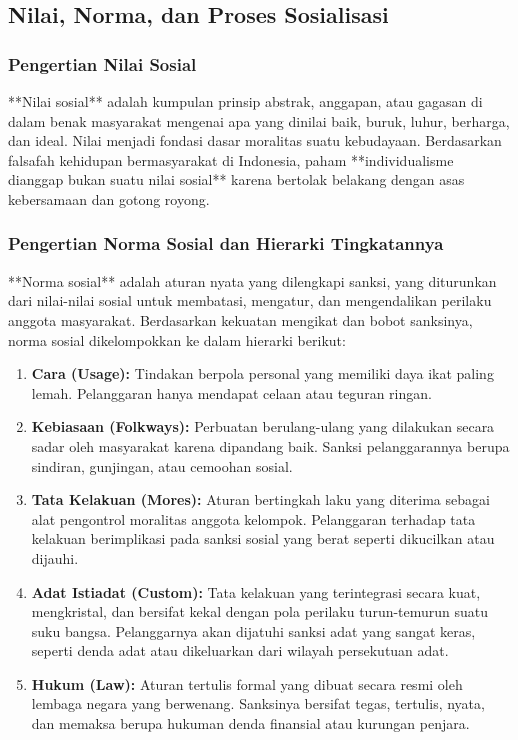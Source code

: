 \documentclass[12pt, a4paper]{article}
\begin{document}
\subsection{Nilai, Norma, dan Proses Sosialisasi}

\subsubsection{Pengertian Nilai Sosial}
**Nilai sosial** adalah kumpulan prinsip abstrak, anggapan, atau gagasan di dalam benak masyarakat mengenai apa yang dinilai baik, buruk, luhur, berharga, dan ideal. Nilai menjadi fondasi dasar moralitas suatu kebudayaan. Berdasarkan falsafah kehidupan bermasyarakat di Indonesia, paham **individualisme dianggap bukan suatu nilai sosial** karena bertolak belakang dengan asas kebersamaan dan gotong royong.

\subsubsection{Pengertian Norma Sosial dan Hierarki Tingkatannya}
**Norma sosial** adalah aturan nyata yang dilengkapi sanksi, yang diturunkan dari nilai-nilai sosial untuk membatasi, mengatur, dan mengendalikan perilaku anggota masyarakat. Berdasarkan kekuatan mengikat dan bobot sanksinya, norma sosial dikelompokkan ke dalam hierarki berikut:
\begin{enumerate}
    \item \textbf{Cara (Usage):} Tindakan berpola personal yang memiliki daya ikat paling lemah. Pelanggaran hanya mendapat celaan atau teguran ringan.
    \item \textbf{Kebiasaan (Folkways):} Perbuatan berulang-ulang yang dilakukan secara sadar oleh masyarakat karena dipandang baik. Sanksi pelanggarannya berupa sindiran, gunjingan, atau cemoohan sosial.
    \item \textbf{Tata Kelakuan (Mores):} Aturan bertingkah laku yang diterima sebagai alat pengontrol moralitas anggota kelompok. Pelanggaran terhadap tata kelakuan berimplikasi pada sanksi sosial yang berat seperti dikucilkan atau dijauhi.
    \item \textbf{Adat Istiadat (Custom):} Tata kelakuan yang terintegrasi secara kuat, mengkristal, dan bersifat kekal dengan pola perilaku turun-temurun suatu suku bangsa. Pelanggarnya akan dijatuhi sanksi adat yang sangat keras, seperti denda adat atau dikeluarkan dari wilayah persekutuan adat.
    \item \textbf{Hukum (Law):} Aturan tertulis formal yang dibuat secara resmi oleh lembaga negara yang berwenang. Sanksinya bersifat tegas, tertulis, nyata, dan memaksa berupa hukuman denda finansial atau kurungan penjara.
\end{enumerate}
\end{document}
